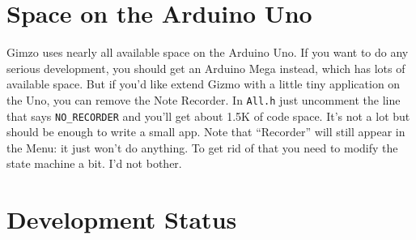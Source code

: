 \documentclass{article}
\begin{document}
\section{Space on the Arduino Uno}
Gimzo uses nearly all available space on the Arduino Uno.  If you want to do any serious development, you should get an Arduino Mega instead, which has lots of available space.  But if you'd like extend Gizmo with a little tiny application on the Uno, you can remove the Note Recorder.  In \texttt{All.h} just uncomment the line that says \texttt{NO\_RECORDER} and you'll get about 1.5K of code space.  It's not a lot but should be enough to write a small app. Note that ``Recorder'' will still appear in the Menu: it just won't do anything.  To get rid of that you need to modify the state machine a bit.  I'd not bother.

\clearpage

\section{Development Status}
\end{document}
